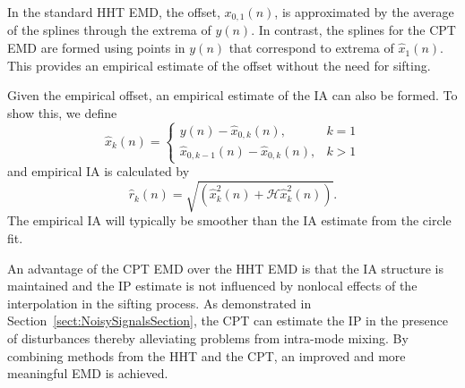 \documentclass[11pt,draftcls,onecolumn]{IEEEtran}
\begin{document}
In the standard HHT EMD, the offset, $x_{0,1}(n)$, is approximated by the average of the splines through the extrema of $y(n)$. In contrast, the splines for the CPT EMD are formed using points in $y(n)$ that correspond to extrema of $\hat{x}_1(n)$. This provides an empirical estimate of the offset without the need for sifting. 

Given the empirical offset, an empirical estimate of the IA can also be formed. To show this, we define
\begin{equation}
	\hat{x}_k(n) = \left\{ \begin{array}{ll}
		y(n)-\hat{x}_{0,k}(n), & k=1 \\
		\hat{x}_{0,k-1}(n)-\hat{x}_{0,k}(n), & k>1 
		\end{array}\right.
\end{equation}
and empirical IA is calculated by
\begin{equation}
	\hat{r}_k(n) = \sqrt{(\hat{x}^2_k(n) + \mathcal{H}\hat{x}^2_k(n))}.
\end{equation} 
The empirical IA will typically be smoother than the IA estimate from the circle fit. 
 
An advantage of the CPT EMD over the HHT EMD is that the IA structure is maintained and the IP estimate is not influenced by nonlocal effects of the interpolation in the sifting process. As demonstrated in Section~\ref{sect:NoisySignalsSection}, the CPT can estimate the IP in the presence of disturbances thereby alleviating problems from intra-mode mixing. By combining methods from the HHT and the CPT, an improved and more meaningful EMD is achieved. %
% 
\end{document}
